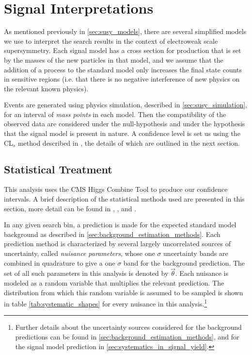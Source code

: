     \clearpage

\section{Signal Interpretations} 

  As mentioned previously in \ref{sec:susy_models}, there are several simplified models we use to interpret the search results in the context of electroweak scale supersymmetry. Each signal model has a cross section for production that is set by the masses of the new particles in that model, and we assume that the addition of a process to the standard model only increases the final state counts in sensitive regions (i.e. that there is no negative interference of new physics on the relevant known physics). 

  Events are generated using physics simulation, described in \ref{sec:susy_simulation}, for an interval of \emph{mass points} in each model. Then the compatibility of the observed data are considered under the null-hypothesis and under the hypothesis that the signal model is present in nature. A confidence level is set us using the CL$_s$ method described in \cite{CLS_method}, the details of which are outlined in the next section.

  \subsection{Statistical Treatment}
    This analysis uses the CMS Higgs Combine Tool \cite{higgs_combine} to produce our confidence intervals. A brief description of the statistical methods used are presented in this section, more detail can be found in \cite{higgs_combine}, \cite{Likelihood_Cowen_Cranmer}, and \cite{CLS_method}. 

    In any given search bin, a prediction is made for the expected standard model background as described in \ref{sec:background_estimation_methods}. Each prediction method is characterized by several largely uncorrelated sources of uncertainty, called \emph{nuisance parameters}, whose one $\sigma$ uncertainty bands are combined in quadrature to give a one $\sigma$ band for the background prediction. The set of all such parameters in this analysis is denoted by $\vec{\theta}$. Each nuisance is modeled as a random variable that multiplies the relevant prediction. The distribution from which this random variable is assumed to be sampled is shown in table \ref{tab:systematic_shapes} for every nuisance in this analysis.\footnote{Further details about the uncertainty sources considered for the background predictions can be found in \ref{sec:background_estimation_methods}, and for the signal model prediction in \ref{sec:systematics_in_signal_yield}.}

